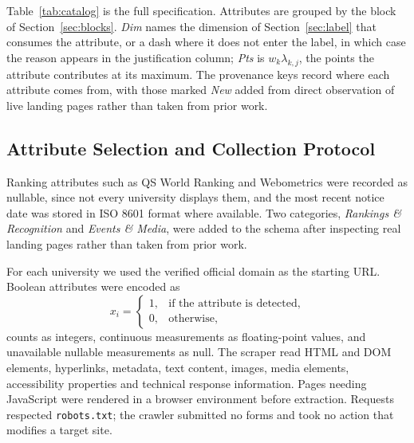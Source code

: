 \documentclass[11pt,a4paper]{article}
\begin{document}
Table~\ref{tab:catalog} is the full specification. Attributes are grouped by the block of
Section~\ref{sec:blocks}. \emph{Dim} names the dimension of Section~\ref{sec:label} that consumes
the attribute, or a dash where it does not enter the label, in which case the reason appears in the
justification column; \emph{Pts} is $w_k \lambda_{k,j}$, the points the attribute contributes at its
maximum. The provenance keys record where each attribute comes from, with those marked \emph{New}
added from direct observation of live landing pages rather than taken from prior work.

\begin{table}[H]\centering\small
\caption{Provenance keys used in the attribute catalogue.}

\end{table}

\footnotesize

\normalsize

\subsection{Attribute Selection and Collection Protocol}

Ranking attributes such as QS World Ranking and Webometrics were recorded as nullable, since not
every university displays them, and the most recent notice date was stored in ISO 8601 format where
available. Two categories, \emph{Rankings \& Recognition} and \emph{Events \& Media}, were added to
the schema after inspecting real landing pages rather than taken from prior work.

For each university we used the verified official domain as the starting URL. Boolean attributes
were encoded as
\begin{equation}
x_i = \begin{cases} 1, & \text{if the attribute is detected,}\\
                    0, & \text{otherwise,}\end{cases}
\end{equation}
counts as integers, continuous measurements as floating-point values, and unavailable nullable
measurements as null. The scraper read HTML and DOM elements, hyperlinks, metadata, text content,
images, media elements, accessibility properties and technical response information. Pages needing
JavaScript were rendered in a browser environment before extraction. Requests respected
\texttt{robots.txt}; the crawler submitted no forms and took no action that modifies a target site.
\end{document}
